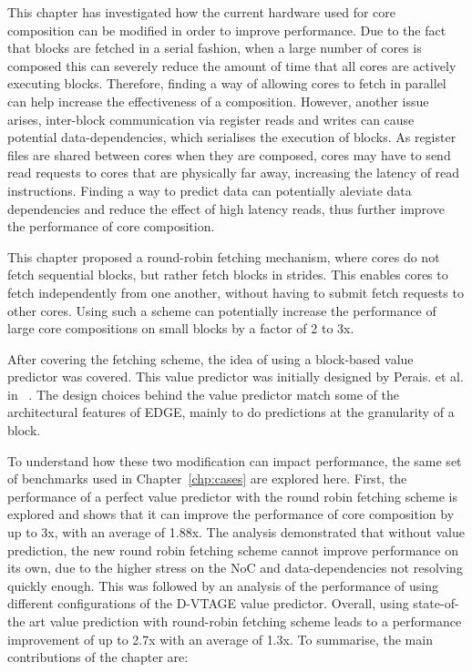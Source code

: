 This chapter has investigated how the current hardware used for core composition can be modified in order to improve performance.
Due to the fact that blocks are fetched in a serial fashion, when a large number of cores is composed this can severely reduce the amount of time that all cores are actively executing blocks.
Therefore, finding a way of allowing cores to fetch in parallel can help increase the effectiveness of a composition.
However, another issue arises, inter-block communication via register reads and writes can cause potential data-dependencies, which serialises the execution of blocks.
As register files are shared between cores when they are composed, cores may have to send read requests to cores that are physically far away, increasing the latency of read instructions.
Finding a way to predict data can potentially aleviate data dependencies and reduce the effect of high latency reads, thus further improve the performance of core composition.

This chapter proposed a round-robin fetching mechanism, where cores do not fetch sequential blocks, but rather fetch blocks in strides.
This enables cores to fetch independently from one another, without having to submit fetch requests to other cores.
Using such a scheme can potentially increase the performance of large core compositions on small blocks by a factor of 2 to 3x.

After covering the fetching scheme, the idea of using a block-based value predictor was covered.
This value predictor was initially designed by Perais. et al. in ~\cite{peraisVTAGE2014, peraisBeBop2015}.
The design choices behind the value predictor match some of the architectural features of EDGE, mainly to do predictions at the granularity of a block.

To understand how these two modification can impact performance, the same set of benchmarks used in Chapter~\ref{chp:cases} are explored here.
First, the performance of a perfect value predictor with the round robin fetching scheme is explored and shows that it can improve the performance of core composition by up to 3x, with an average of 1.88x.
The analysis demonstrated that without value prediction, the new round robin fetching scheme cannot improve performance on its own, due to the higher stress on the NoC and data-dependencies not resolving quickly enough.
This was followed by an analysis of the performance of using different configurations of the D-VTAGE value predictor.
Overall, using state-of-the art value prediction with round-robin fetching scheme leads to a performance improvement of up to 2.7x with an average of 1.3x.
To summarise, the main contributions of the chapter are:

